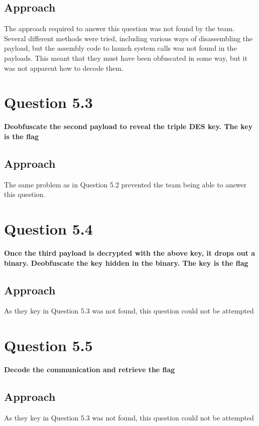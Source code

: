 \subsection{Approach}
The approach required to answer this question was not found by the team.
Several different methods were tried, including various ways of
disassembling the payload, but the assembly code to launch system calls
was not found in the payloads. This meant that they must have been
obfuscated in some way, but it was not apparent how to decode them.

\section{Question 5.3}
\textbf{Deobfuscate the second payload to reveal the triple DES key. The key is
the flag}
\subsection{Approach}
The same problem as in Question 5.2 prevented the team being able to answer
this question.

\section{Question 5.4}
\textbf{Once the third payload is decrypted with the above key, it drops out a
binary. Deobfuscate the key hidden in the binary. The key is the flag}
\subsection{Approach}
As they key in Question 5.3 was not found, this question could not be attempted

\section{Question 5.5}
\textbf{Decode the communication and retrieve the flag}
\subsection{Approach}
As they key in Question 5.3 was not found, this question could not be attempted
